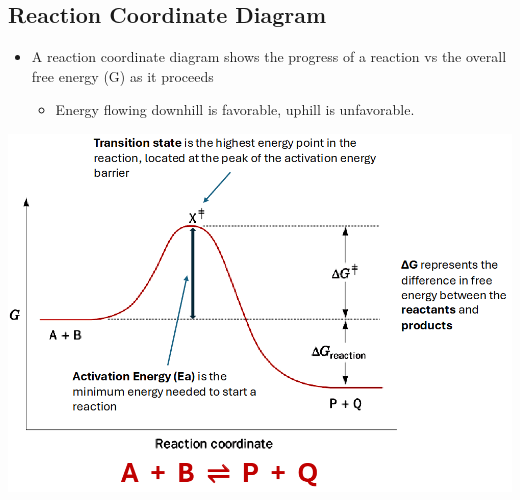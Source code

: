 \documentclass[10pt]{article}
\begin{document}
\subsection*{Reaction Coordinate Diagram}
\begin{itemize}
    \item A reaction coordinate diagram shows the progress of a reaction vs the overall free energy (G) as it proceeds
    \begin{itemize}
        \item Energy flowing downhill is favorable, uphill is unfavorable.
    \end{itemize}
\end{itemize}
\begin{center}
    \includegraphics*[scale=0.6]{L3_8.png}
\end{center}
\end{document}
